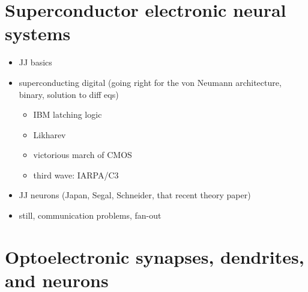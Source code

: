 \documentclass[twocolumn]{article}
\begin{document}
\section{\label{sec:superconductors}Superconductor electronic neural systems}

\begin{itemize}
\item JJ basics
\item superconducting digital (going right for the von Neumann architecture, binary, solution to diff eqs)
\begin{itemize}
\item IBM latching logic
\item Likharev
\item victorious march of CMOS
\item third wave: IARPA/C3
\end{itemize}
\item JJ neurons (Japan, Segal, Schneider, that recent theory paper)
\item still, communication problems, fan-out
\end{itemize}

\section{\label{sec:optoelectronicNeurons}Optoelectronic synapses, dendrites, and neurons}
\end{document}
